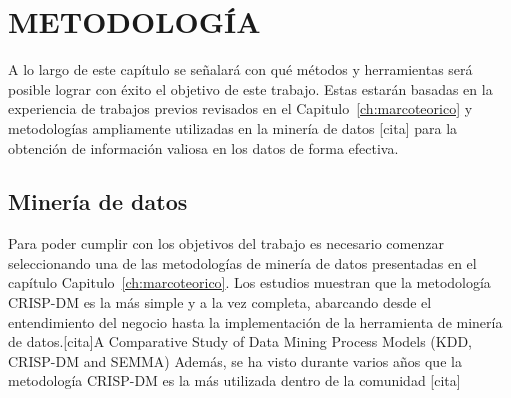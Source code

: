 \chapter{METODOLOGÍA}
\label{ch:metodologia}

A lo largo de este capítulo se señalará con qué métodos y herramientas será posible lograr con éxito el objetivo de este trabajo. Estas estarán basadas en la experiencia de trabajos previos revisados en el Capitulo~\ref{ch:marcoteorico} y metodologías ampliamente utilizadas en la minería de datos [cita] para la obtención de información valiosa en los datos de forma efectiva.

\section{Minería de datos}

Para poder cumplir con los objetivos del trabajo es necesario comenzar seleccionando una de las metodologías de minería de datos presentadas en el capítulo Capitulo~\ref{ch:marcoteorico}. Los estudios muestran que la metodología CRISP-DM es la más simple y a la vez completa, abarcando desde el entendimiento del negocio hasta la implementación de la herramienta de minería de datos.[cita]A Comparative Study of Data Mining Process Models (KDD, CRISP-DM and SEMMA) Además, se ha visto durante varios años que la metodología CRISP-DM es la más utilizada dentro de la comunidad [cita] %

